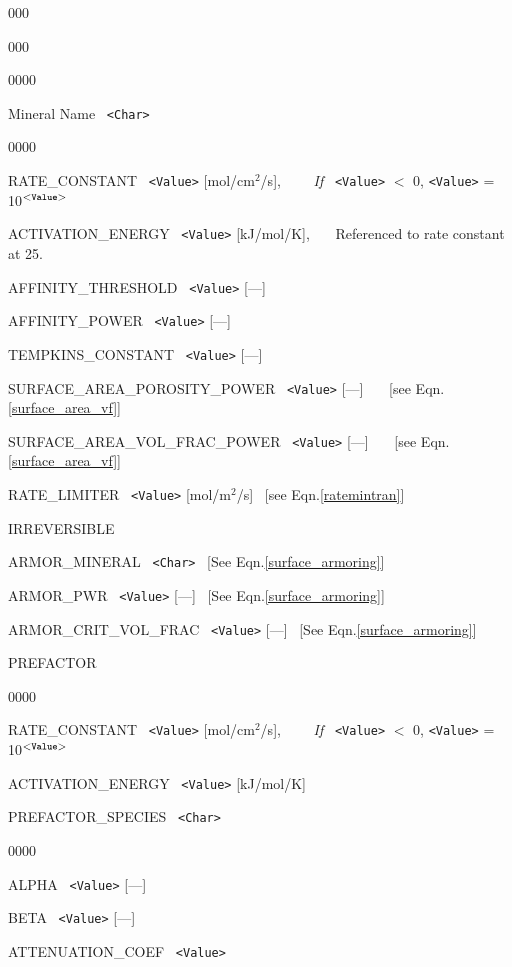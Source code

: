 \documentclass[12pt]{article}
\begin{document}
\begin{deflist}{000}
\begin{deflist}{000}
\begin{deflist}{0000}
\item [Mineral Name]  \ {\tt <Char>}
\begin{deflist}{0000}
\item [RATE\_CONSTANT] \ {\tt <Value>} [mol/cm$^2$/s], \ \ \ \ {\em If} \ {\tt <Value>} $<$ 0, {\tt <Value>} = 10$^{\tt <Value>}$
\item [ACTIVATION\_ENERGY] \ {\tt <Value>} [kJ/mol/K], \ \ \ Referenced to rate constant at 25\degc.
~\\
\item [AFFINITY\_THRESHOLD] \ {\tt <Value>} [---]
\item [AFFINITY\_POWER] \ {\tt <Value>} [---]
~\\
\item [TEMPKINS\_CONSTANT] \ {\tt <Value>} [---]
~\\
\item [SURFACE\_AREA\_POROSITY\_POWER] \ {\tt <Value>} [---] \ \ \ [see Eqn.\eqref{surface_area_vf}]
\item [SURFACE\_AREA\_VOL\_FRAC\_POWER] \ {\tt <Value>} [---] \ \ \ [see Eqn.\eqref{surface_area_vf}]
~\\
\item [RATE\_LIMITER] \ {\tt <Value>} [mol/m$^2$/s] \ [see Eqn.\eqref{ratemintran}]
~\\
\item [IRREVERSIBLE] \ 
~\\
\item[ARMOR\_MINERAL] \ {\tt <Char>} \ [See Eqn.\eqref{surface_armoring}]
\item[ARMOR\_PWR] \ {\tt <Value>} [---] \ [See Eqn.\eqref{surface_armoring}]
\item[ARMOR\_CRIT\_VOL\_FRAC] \ {\tt <Value>} [---] \ [See Eqn.\eqref{surface_armoring}]
~\\
\item [PREFACTOR] ~
\begin{deflist}{0000}
\item [RATE\_CONSTANT] \ {\tt <Value>} [mol/cm$^2$/s], \ \ \ \ {\em If} \ {\tt <Value>} $<$ 0, {\tt <Value>} = 10$^{\tt <Value>}$
\item [ACTIVATION\_ENERGY] \ {\tt <Value>} [kJ/mol/K] 
\item [PREFACTOR\_SPECIES] \ {\tt <Char>}
\begin{deflist}{0000}
\item [ALPHA] \ {\tt <Value>} [---]
\item [BETA] \ {\tt <Value>} [---]
\item [ATTENUATION\_COEF] \ {\tt <Value>}
\end{deflist}
\item [\keyend]
\end{deflist}
\item [\keyend]
\end{deflist}


\end{deflist}
\end{deflist}
\end{deflist}
\end{document}

